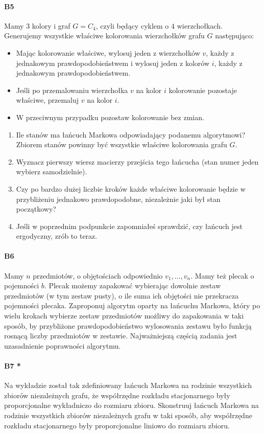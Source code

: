 \paragraph{B5} Mamy $3$ kolory i graf $G = C_4$, czyli będący cyklem o $4$ wierzchołkach. Generujemy wszystkie właściwe kolorowania wierzchołków grafu $G$ następująco:
\begin{itemize}
\item Mając kolorowanie właściwe, wylosuj jeden z wierzchołków $v$, każdy z jednakowym prawdopodobieństwem i wylosuj jeden z kolorów $i$, każdy z jednakowym prawdopodobieństwem.
\item Jeśli po przemalowaniu wierzchołka $v$ na kolor $i$ kolorowanie pozostaje właściwe, przemaluj $v$ na kolor $i$.
\item W przeciwnym przypadku pozostaw kolorowanie bez zmian.
\end{itemize}
\begin{enumerate}[label=\alph*)]
\item Ile stanów ma łańcuch Markowa odpowiadający podanemu algorytmowi? Zbiorem stanów powinny być
wszystkie właściwe kolorowania grafu $G$.
\item Wyznacz pierwszy wiersz macierzy przejścia tego łańcucha (stan numer jeden wybierz samodzielnie).
\item Czy po bardzo dużej liczbie kroków każde właściwe kolorowanie będzie w przybliżeniu jednakowo prawdopodobne, niezależnie jaki był stan początkowy?
\item Jeśli w poprzednim podpunkcie zapomniałeś sprawdzić, czy łańcuch jest ergodyczny, zrób to teraz.
\end{enumerate}


\paragraph{B6} Mamy $n$ przedmiotów, o objętościach odpowiednio $v_1, . . . , v_n$. Mamy też plecak o pojemności $b$. Plecak możemy zapakować wybierając dowolnie zestaw przedmiotów (w tym zestaw pusty), o ile suma ich objętości nie przekracza pojemności plecaka. Zaproponuj algorytm oparty na łańcuchu Markowa, który po wielu krokach wybierze zestaw przedmiotów możliwy do zapakowania w taki sposób, by przybliżone prawdopodobieństwo wylosowania zestawu było funkcją rosnącą liczby przedmiotów w zestawie. Najważniejszą częścią zadania jest uzasadnienie poprawności algorytmu.

\paragraph{B7 *} Na wykładzie został tak zdefiniowany łańcuch Markowa na rodzinie wszystkich zbiorów niezależnych grafu, że współrzędne rozkładu stacjonarnego były proporcjonalne wykładniczo do rozmiaru zbioru. Skonstruuj łańcuch Markowa na rodzinie wszystkich zbiorów niezależnych grafu w taki sposób, aby współrzędne rozkładu stacjonarnego były proporcjonalne liniowo do rozmiaru zbioru.

